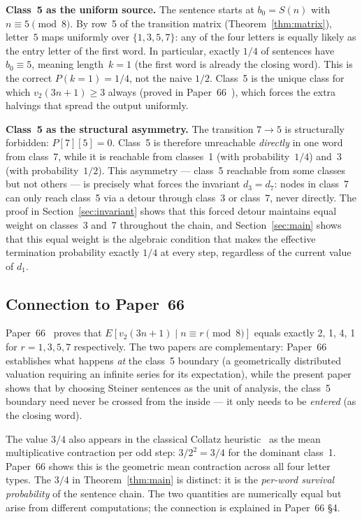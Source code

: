 \documentclass[12pt]{article}
\theoremstyle{definition}
\theoremstyle{remark}
\newcommand{\vt}{v_2}
\newcommand{\Sm}{S}
\begin{document}
\textbf{Class~5 as the uniform source.}
The sentence starts at $b_0 = \Sm(n)$ with $n \equiv 5 \pmod 8$.
By row~5 of the transition matrix (Theorem~\ref{thm:matrix}), letter~$5$
maps uniformly over $\{1,3,5,7\}$: any of the four letters is equally
likely as the entry letter of the first word.
In particular, exactly $1/4$ of sentences have $b_0 \equiv 5$, meaning
length~$k=1$ (the first word is already the closing word).
This is the correct $P(k=1) = 1/4$, not the naive $1/2$.
Class~5 is the unique class for which $\vt(3n+1) \geq 3$ always
(proved in Paper~66~\cite{paper66}), which forces the extra halvings
that spread the output uniformly.

\textbf{Class~5 as the structural asymmetry.}
The transition $7 \to 5$ is structurally forbidden: $P[7][5] = 0$.
Class~5 is therefore unreachable \emph{directly} in one word from class~7,
while it is reachable from classes~1 (with probability~$1/4$) and~3
(with probability~$1/2$).
This asymmetry — class~5 reachable from some classes but not others — is
precisely what forces the invariant $d_3 = d_7$: nodes in class~7 can
only reach class~5 via a detour through class~3 or class~7, never directly.
The proof in Section~\ref{sec:invariant} shows that this forced detour
maintains equal weight on classes~3 and~7 throughout the chain, and
Section~\ref{sec:main} shows that this equal weight is the algebraic
condition that makes the effective termination probability exactly $1/4$
at every step, regardless of the current value of $d_1$.

\subsection{Connection to Paper~66}

Paper~66~\cite{paper66} proves that $E[\vt(3n+1) \mid n \equiv r \pmod 8]$
equals exactly 2, 1, 4, 1 for $r = 1,3,5,7$ respectively.
The two papers are complementary: Paper~66 establishes what happens \emph{at}
the class~5 boundary (a geometrically distributed valuation requiring an
infinite series for its expectation), while the present paper shows that by
choosing Steiner sentences as the unit of analysis, the class~5 boundary
need never be crossed from the inside — it only needs to be \emph{entered}
(as the closing word).

The value $3/4$ also appears in the classical Collatz heuristic~\cite{terras,lagarias}
as the mean multiplicative contraction per odd step: $3/2^2 = 3/4$ for the
dominant class~1.
Paper~66 shows this is the geometric mean contraction across all four letter types.
The $3/4$ in Theorem~\ref{thm:main} is distinct: it is the \emph{per-word survival
probability} of the sentence chain.
The two quantities are numerically equal but arise from different computations; the
connection is explained in Paper~66 §4.
\end{document}
